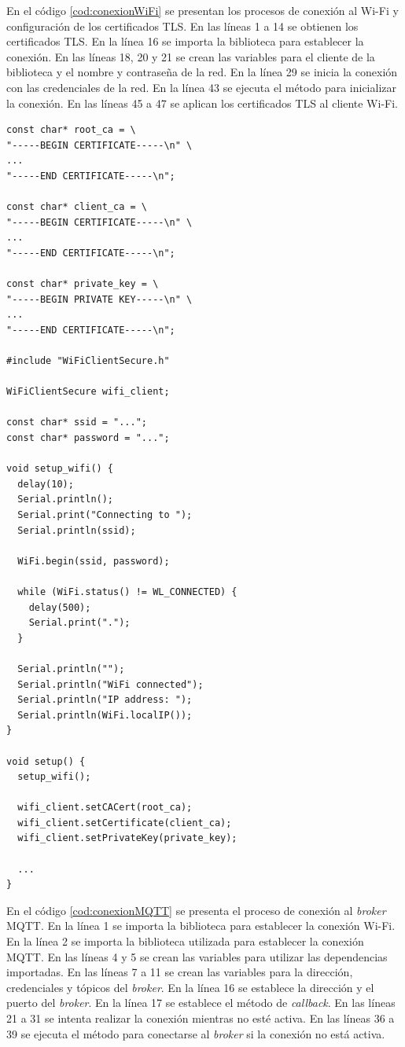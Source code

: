 
En el código \ref{cod:conexionWiFi} se presentan los procesos de conexión al Wi-Fi y configuración de los certificados TLS. En las líneas 1 a 14 se obtienen los certificados TLS. En la línea 16 se importa la biblioteca para establecer la conexión. En las líneas 18, 20 y 21 se crean las variables para el cliente de la biblioteca y el nombre y contraseña de la red. En la línea 29 se inicia la conexión con las credenciales de la red. En la línea 43 se ejecuta el método para inicializar la conexión. En las líneas 45 a 47 se aplican los certificados TLS al cliente Wi-Fi.

\begin{lstlisting}[label=cod:conexionWiFi,caption=Conexión Wi-Fi y configuración de los certificados TLS]
const char* root_ca = \
"-----BEGIN CERTIFICATE-----\n" \
...
"-----END CERTIFICATE-----\n";

const char* client_ca = \
"-----BEGIN CERTIFICATE-----\n" \
...
"-----END CERTIFICATE-----\n";

const char* private_key = \
"-----BEGIN PRIVATE KEY-----\n" \
...
"-----END CERTIFICATE-----\n";

#include "WiFiClientSecure.h"

WiFiClientSecure wifi_client;

const char* ssid = "...";
const char* password = "...";

void setup_wifi() {
  delay(10);
  Serial.println();
  Serial.print("Connecting to ");
  Serial.println(ssid);

  WiFi.begin(ssid, password);

  while (WiFi.status() != WL_CONNECTED) {
    delay(500);
    Serial.print(".");
  }

  Serial.println("");
  Serial.println("WiFi connected");
  Serial.println("IP address: ");
  Serial.println(WiFi.localIP());
}

void setup() {
  setup_wifi();

  wifi_client.setCACert(root_ca);
  wifi_client.setCertificate(client_ca);
  wifi_client.setPrivateKey(private_key);
  
  ...
}
\end{lstlisting}

En el código \ref{cod:conexionMQTT} se presenta el proceso de conexión al \emph{broker} MQTT. En la línea 1 se importa la biblioteca para establecer la conexión Wi-Fi. En la línea 2 se importa la biblioteca utilizada para establecer la conexión MQTT. En las  líneas 4 y 5 se crean las variables para utilizar las dependencias importadas. En las líneas 7 a 11 se crean las variables para la dirección, credenciales y tópicos del \emph{broker}. En la línea 16 se establece la dirección y el puerto del \emph{broker}. En la línea 17 se establece el método de \emph{callback}. En las líneas 21 a 31 se intenta realizar la conexión mientras no esté activa. En las líneas 36 a 39 se ejecuta el método para conectarse al \emph{broker} si la conexión no está activa.


